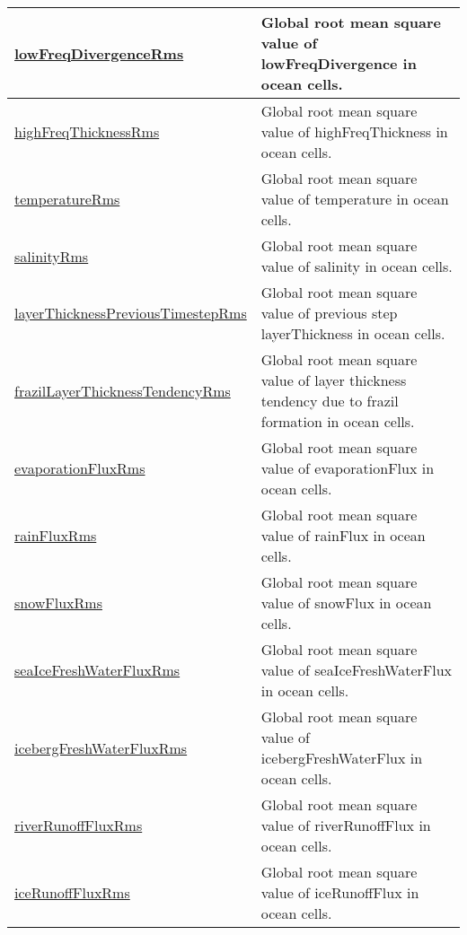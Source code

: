 {\begin{center}
\begin{longtable}{| p{2.0in} | p{4.0in} |}
    \hline
    \hyperref[subsec:var_sec_globalStatsAM_lowFreqDivergenceRms]{lowFreqDivergenceRms} & Global root mean square value of lowFreqDivergence in ocean cells. \\
    \hline
    \hyperref[subsec:var_sec_globalStatsAM_highFreqThicknessRms]{highFreqThicknessRms} & Global root mean square value of highFreqThickness in ocean cells. \\
    \hline
    \hyperref[subsec:var_sec_globalStatsAM_temperatureRms]{temperatureRms} & Global root mean square value of temperature in ocean cells. \\
    \hline
    \hyperref[subsec:var_sec_globalStatsAM_salinityRms]{salinityRms} & Global root mean square value of salinity in ocean cells. \\
    \hline
    \hyperref[subsec:var_sec_globalStatsAM_layerThicknessPreviousTimestepRms]{layerThicknessPreviousTimestep\-Rms} & Global root mean square value of previous step layerThickness in ocean cells. \\
    \hline
    \hyperref[subsec:var_sec_globalStatsAM_frazilLayerThicknessTendencyRms]{frazilLayerThicknessTendencyRms} & Global root mean square value of layer thickness tendency due to frazil formation in ocean cells. \\
    \hline
    \hyperref[subsec:var_sec_globalStatsAM_evaporationFluxRms]{evaporationFluxRms} & Global root mean square value of evaporationFlux in ocean cells. \\
    \hline
    \hyperref[subsec:var_sec_globalStatsAM_rainFluxRms]{rainFluxRms} & Global root mean square value of rainFlux in ocean cells. \\
    \hline
    \hyperref[subsec:var_sec_globalStatsAM_snowFluxRms]{snowFluxRms} & Global root mean square value of snowFlux in ocean cells. \\
    \hline
    \hyperref[subsec:var_sec_globalStatsAM_seaIceFreshWaterFluxRms]{seaIceFreshWaterFluxRms} & Global root mean square value of seaIceFreshWaterFlux in ocean cells. \\
    \hline
    \hyperref[subsec:var_sec_globalStatsAM_icebergFreshWaterFluxRms]{icebergFreshWaterFluxRms} & Global root mean square value of icebergFreshWaterFlux in ocean cells. \\
    \hline
    \hyperref[subsec:var_sec_globalStatsAM_riverRunoffFluxRms]{riverRunoffFluxRms} & Global root mean square value of riverRunoffFlux in ocean cells. \\
    \hline
    \hyperref[subsec:var_sec_globalStatsAM_iceRunoffFluxRms]{iceRunoffFluxRms} & Global root mean square value of iceRunoffFlux in ocean cells. \\

\end{longtable}
\end{center}}
